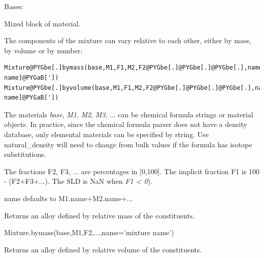\documentclass[letterpaper,10pt,english]{sphinxmanual}
\begin{document}
\begin{fulllineitems}
\label{api/material:refl1d.material.Mixture}
Bases: {\hyperref[api/material:refl1d.material.Scatterer]{}}

Mixed block of material.

The components of the mixture can vary relative to each other, either
by mass, by volume or by number:

\begin{Verbatim}[commandchars=@\[\]]
Mixture@PYGbe[.]bymass(base,M1,F1,M2,F2@PYGbe[.]@PYGbe[.]@PYGbe[.],name@PYGbe[=]@PYGaB[']@PYGaB[mixture name]@PYGaB['])
Mixture@PYGbe[.]byvolume(base,M1,F1,M2,F2@PYGbe[.]@PYGbe[.]@PYGbe[.],name@PYGbe[=]@PYGaB[']@PYGaB[mixture name]@PYGaB['])
\end{Verbatim}

The materials \emph{base}, \emph{M1}, \emph{M2}, \emph{M3}, ... can be chemical formula
strings  or material objects.  In practice, since the chemical
formula parser does not have a density database, only elemental
materials can be specified by string. Use natural\_density will need
to change from bulk values if the formula has isotope substitutions.

The fractions F2, F3, ... are percentages in {[}0,100{]}. The implicit
fraction F1 is 100 - (F2+F3+...). The SLD is NaN when \emph{F1 \textless{} 0}).

name defaults to M1.name+M2.name+...

\begin{fulllineitems}
\label{api/material:refl1d.material.Mixture.bymass}
Returns an alloy defined by relative mass of the constituents.

Mixture.bymass(base,M1,F2,...,name='mixture name')

\end{fulllineitems}


\begin{fulllineitems}
\label{api/material:refl1d.material.Mixture.byvolume}
Returns an alloy defined by relative volume of the constituents.


\end{fulllineitems}
\end{fulllineitems}
\end{document}
